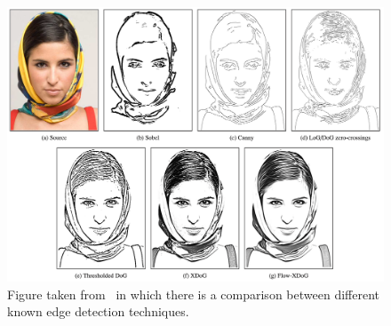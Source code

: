 \begin{figure}[htbp]
\centering
  \includegraphics[scale=0.4]{figures/comparisonOfEdgeDetectors.png}
  \caption{Figure taken from~\cite{xdog} in which there is a comparison between different known edge detection techniques.}
  \label{fig:xdog-paperComparison}
\end{figure}
